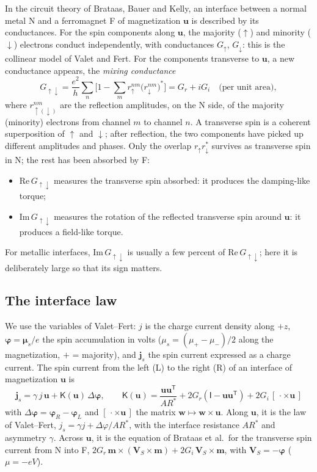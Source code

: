 \documentclass[11pt,a4paper]{article}
\newcommand{\vm}{\bm{m}}
\newcommand{\vu}{\bm{u}}
\newcommand{\vphi}{\bm{\varphi}}
\newcommand{\Id}{\mathsf{I}}
\newcommand{\mK}{\mathsf{K}}
\begin{document}
In the circuit theory of Brataas, Bauer and Kelly, an interface between a
normal metal N and a ferromagnet F of magnetization $\vu$ is described by
its conductances. For the spin components along $\vu$, the majority
($\uparrow$) and minority ($\downarrow$) electrons conduct independently,
with conductances $G_\uparrow$, $G_\downarrow$: this is the collinear
model of Valet and Fert. For the components transverse to $\vu$, a new
conductance appears, the \emph{mixing conductance}
\begin{equation}
  G_{\uparrow\downarrow} = \frac{e^2}{h}\sum_{n}\Big[1 - \sum_m
    r_\uparrow^{nm}\big(r_\downarrow^{nm}\big)^*\Big]
  = G_r + iG_i \quad\text{(per unit area)},
\end{equation}
where $r_{\uparrow(\downarrow)}^{nm}$ are the reflection amplitudes, on the N
side, of the majority (minority) electrons from channel $m$ to channel
$n$. A transverse spin is a coherent superposition of $\uparrow$ and
$\downarrow$; after reflection, the two components have picked up
different amplitudes and phases. Only the overlap $r_\uparrow
r_\downarrow^*$ survives as transverse spin in N; the rest has been
absorbed by F:
\begin{itemize}
  \item $\mathrm{Re}\,G_{\uparrow\downarrow}$ measures the transverse
    spin absorbed: it produces the damping-like torque;
  \item $\mathrm{Im}\,G_{\uparrow\downarrow}$ measures the rotation of the
    reflected transverse spin around $\vu$: it produces a field-like
    torque.
\end{itemize}
For metallic interfaces, $\mathrm{Im}\,G_{\uparrow\downarrow}$ is usually
a few percent of $\mathrm{Re}\,G_{\uparrow\downarrow}$; here it is
deliberately large so that its sign matters.

\subsection{The interface law}

We use the variables of Valet--Fert: $j$ is the charge current density
along $+z$, $\vphi = \bm{\mu}_s/e$ the spin accumulation in volts
($\mu_s = (\mu_+-\mu_-)/2$ along the magnetization, $+$ = majority), and
$\bm{j}_s$ the spin current expressed as a charge current. The spin
current from the left (L) to the right (R) of an interface of
magnetization $\vu$ is
\begin{equation}
  \boxed{\;\bm{j}_s = \gamma\,j\,\vu + \mK(\vu)\,\Delta\vphi,
  \qquad
  \mK(\vu) = \frac{\vu\vu^{\mathsf{T}}}{AR^*}
    + 2G_r\left(\Id-\vu\vu^{\mathsf{T}}\right)
    + 2G_i\,[\,\cdot\times\vu\,]\;}
  \label{eq:interface}
\end{equation}
with $\Delta\vphi = \vphi_R-\vphi_L$ and $[\,\cdot\times\vu\,]$ the matrix
$\bm{w}\mapsto\bm{w}\times\vu$. Along $\vu$, it is the law of Valet--Fert,
$j_s = \gamma j + \Delta\varphi/AR^*$, with the interface resistance
$AR^*$ and asymmetry $\gamma$. Across $\vu$, it is the equation of Brataas
et al.\ for the transverse spin current from N into F,
$2G_r\,\vm\times(\bm{V}_S\times\vm) + 2G_i\,\bm{V}_S\times\vm$, with
$\bm{V}_S = -\vphi$ ($\mu = -eV$).
\end{document}
